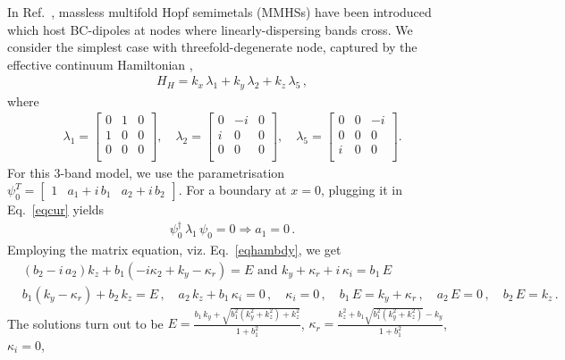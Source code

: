 \documentclass[aps,prb,onecolumn, footinbib, 10pt]{revtex4-2}
\def \nn{\nonumber \\}
\begin{document}
In Ref.~\cite{graf-hopf}, massless multifold Hopf semimetals (MMHSs) have been introduced which host BC-dipoles at nodes where linearly-dispersing bands cross. We consider the simplest case with threefold-degenerate node, captured by the effective continuum Hamiltonian \cite{graf-hopf, hopf2, hopf3},
\begin{align}
\label{eqbcd2}
H_{H} = k_x \,\lambda_1 + k_y \,\lambda_2+ k_z\,\lambda_5\,,
\end{align}
where
\begin{align}
\lambda_1 =  \begin{bmatrix}
 0 & 1 & 0 \\
 1 & 0 & 0 \\
 0 & 0 & 0 \\
\end{bmatrix}, \quad
\lambda_2 = \begin{bmatrix}
 0 & -i & 0 \\
 i & 0 & 0 \\
 0 & 0 & 0 \\
\end{bmatrix}, \quad
\lambda_5 = \begin{bmatrix}
 0 & 0 & -i \\
 0 & 0 & 0 \\
 i & 0 & 0 \\
\end{bmatrix} .
\end{align}
For this 3-band model, we use the parametrisation $ \psi_0^T  = \begin{bmatrix}
1 & a_1 +i \, b_1 & a_2 + i\, b_2 \end{bmatrix}$. For a boundary at $x=0$, plugging it in Eq.~\eqref{eqcur} yields
\begin{align}
\psi_0^\dagger\, \lambda_1\, \psi_0 = 0 \Rightarrow a_1 = 0\,.
\end{align}
Employing the matrix equation, viz. Eq.~\eqref{eqhambdy}, we get
\begin{align}
& \left(b_2-i \,a_2\right) k_z+b_1 \left(-i \kappa_2+k_y-\kappa_r\right) = E 
\text{ and }
 k_y+\kappa_r + i \, \kappa_i = b_1 \, E \nn
& b_1 \left(k_y-\kappa_r\right)+b_2 \, k_z = E\,,\quad
a_2 \, k_z+b_1 \, \kappa_i = 0\,,\quad \kappa_i = 0 \,, \quad
b_1 \, E =  k_y+\kappa_r\,,\quad a_2\, E = 0\,,\quad b_2\, E = k_z\,.
\end{align}
The solutions turn out to be
$E = \frac{ b_1 \,k_y + \sqrt{b_1^2 \left(k_y^2+k_z^2\right)+k_z^2}} { 1 + b_1^2  }$,
$\kappa_r = \frac{ k_z^2 + b_1 \sqrt{b_1^2 \left(k_y^2+k_z^2\right) }-k_y}{ 1 + b_1^2}$, $\kappa_i  = 0 $,
\end{document}
